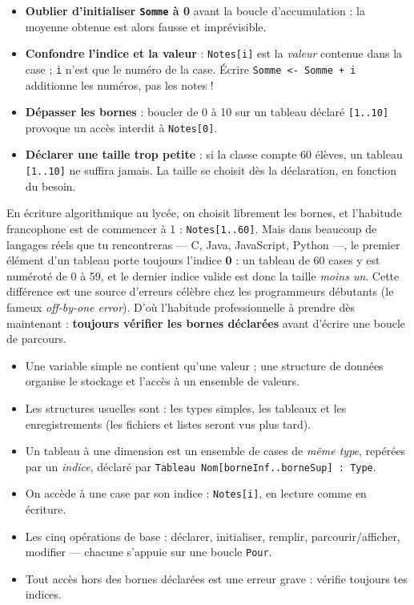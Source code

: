 \documentclass[11pt]{article}
\newcommand{\cle}[1]{{\popxbold\color{popdark}#1}}
\begin{document}
\begin{attention}
\begin{itemize}
  \item \textbf{Oublier d'initialiser \texttt{Somme} à 0} avant la boucle d'accumulation : la moyenne obtenue est alors fausse et imprévisible.
  \item \textbf{Confondre l'indice et la valeur} : \texttt{Notes[i]} est la \emph{valeur} contenue dans la case ; \texttt{i} n'est que le numéro de la case. Écrire \texttt{Somme <- Somme + i} additionne les numéros, pas les notes !
  \item \textbf{Dépasser les bornes} : boucler de 0 à 10 sur un tableau déclaré \texttt{[1..10]} provoque un accès interdit à \texttt{Notes[0]}.
  \item \textbf{Déclarer une taille trop petite} : si la classe compte 60 élèves, un tableau \texttt{[1..10]} ne suffira jamais. La taille se choisit dès la déclaration, en fonction du besoin.
\end{itemize}
\end{attention}

\begin{savaistu}
En écriture algorithmique au lycée, on choisit librement les bornes, et l'habitude francophone est de commencer à 1 : \texttt{Notes[1..60]}. Mais dans beaucoup de langages réels que tu rencontreras — C, Java, JavaScript, Python —, le premier élément d'un tableau porte toujours l'indice \textbf{0} : un tableau de 60 cases y est numéroté de 0 à 59, et le dernier indice valide est donc la taille \emph{moins un}. Cette différence est une source d'erreurs célèbre chez les programmeurs débutants (le fameux \emph{off-by-one error}). D'où l'habitude professionnelle à prendre dès maintenant : \textbf{toujours vérifier les bornes déclarées} avant d'écrire une boucle de parcours.
\end{savaistu}

\begin{aretenir}
\begin{itemize}
  \item Une variable simple ne contient qu'une valeur ; une \cle{structure de données} organise le stockage et l'accès à un ensemble de valeurs.
  \item Les structures usuelles sont : les types simples, les \cle{tableaux} et les \cle{enregistrements} (les fichiers et listes seront vus plus tard).
  \item Un tableau à une dimension est un ensemble de cases de \emph{même type}, repérées par un \emph{indice}, déclaré par \texttt{Tableau Nom[borneInf..borneSup] : Type}.
  \item On accède à une case par son indice : \texttt{Notes[i]}, en lecture comme en écriture.
  \item Les cinq opérations de base : déclarer, initialiser, remplir, parcourir/afficher, modifier — chacune s'appuie sur une boucle \texttt{Pour}.
  \item Tout accès hors des bornes déclarées est une erreur grave : vérifie toujours tes indices.
\end{itemize}
\end{aretenir}
\end{document}
